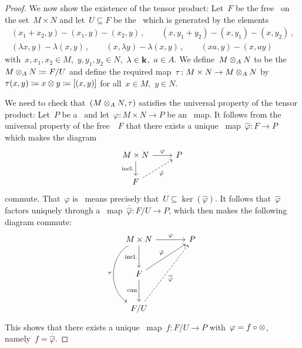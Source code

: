\begin{proof}
  We now show the existence of the tensor product:
  Let~$F$ be the free~{\module{$\kf$}} on the set~$M \times N$ and let~$U \subseteq F$ be the~{\submodule{$\kf$}} which is generated by the elements
  \begin{gather*}
    (x_1 + x_2, y) - (x_1, y) - (x_2, y) \,,
    \qquad
    (x, y_1 + y_2) - (x, y_1) - (x, y_2) \,,
    \\
    (\lambda x, y) - \lambda (x,y) \,,
    \qquad
    (x, \lambda y) - \lambda (x,y) \,,
    \qquad
    (xa, y) - (x, ay)
  \end{gather*}
  with~$x, x_1, x_2 \in M$,~$y, y_1, y_2 \in N$,~$\lambda \in \mathbf{k}$,~$a \in A$.
  We define~$M \otimes_A N$ to be the~{\module{$\kf$}}~$M \otimes_A N \coloneqq F/U$ and define the required map~$\tau \colon M \times N \to M \otimes_A N$ by~$\tau(x,y) \coloneqq x \otimes y \coloneqq [(x,y)]$ for all~$x \in M$,~$y \in N$.
  
  We need to check that~$(M \otimes_A N, \tau)$ satisfies the universal property of the tensor product:
  Let~$P$ be a~{\module{$\kf$}} and let~$\varphi \colon M \times N \to P$ be an~{} map.
  It follows from the universal property of the free~{\module{$\kf$}}~$F$ that there exists a unique~{\klin} map~$\hat{\varphi} \colon F \to P$ which makes the diagram
  \[
    \begin{tikzcd}
        M \times N
        \arrow{r}[above]{\varphi}
        \arrow{d}[left]{\text{incl.}}
      & P
      \\
        F
        \arrow[dashed]{ur}[below right]{\hat{\varphi}}
      & {}
    \end{tikzcd}
  \]
  commute.
  That~$\varphi$ is~{} means precisely that~$U \subseteq \ker(\hat{\varphi})$.
  It follows that~$\hat{\varphi}$ factors uniquely through a~{\klin} map~$\overline{\hat{\varphi}} \colon F/U \to P$, which then makes the following diagram commute:
  \[
    \begin{tikzcd}[sep = large]
        M \times N
        \arrow{r}[above]{\varphi}
        \arrow{d}[left]{\text{incl.}}
        \arrow[bend right = 60]{dd}[left]{\tau}
      & P
      \\
        F
        \arrow{ur}[above left]{\hat{\varphi}}
        \arrow{d}[left]{\text{can}}
      & {}
      \\
        F/U
        \arrow[dashed]{uur}[below right]{\overline{\hat{\varphi}}}
      & {}
    \end{tikzcd}
  \]
  This shows that there exists a unique~{\klin} map~$f \colon F/U \to P$ with~$\varphi = f \circ \otimes$, namely~$f = \overline{\hat{\varphi}}$.
\end{proof}


